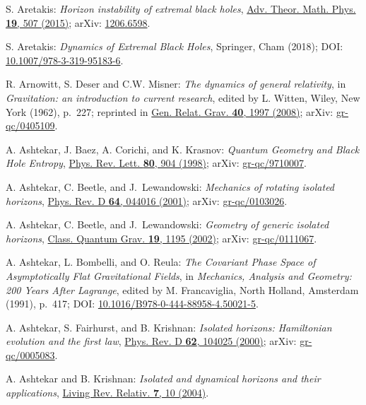 \begin{thebibliography}{123}
S. Aretakis:
{\em Horizon instability of extremal black holes},
\href{https://doi.org/10.4310/ATMP.2015.v19.n3.a1}{Adv. Theor. Math. Phys. {\bf 19}, 507 (2015)};
arXiv: \href{https://arxiv.org/abs/1206.6598}{1206.6598}.

S. Aretakis:
{\em Dynamics of Extremal Black Holes},
Springer, Cham (2018);
DOI: \href{https://doi.org/10.1007/978-3-319-95183-6}{10.1007/978-3-319-95183-6}.

R. Arnowitt, S. Deser and C.W. Misner:
{\em The dynamics of general relativity},
in {\em Gravitation: an introduction to current research},
edited by L. Witten,
Wiley, New York (1962), p.~227; reprinted in
\href{https://doi.org/10.1007/s10714-008-0661-1}{Gen. Relat. Grav. {\bf 40}, 1997 (2008)};
arXiv: \href{https://arxiv.org/abs/gr-qc/0405109}{gr-qc/0405109}.

A. Ashtekar, J. Baez, A. Corichi, and K. Krasnov:
{\em Quantum Geometry and Black Hole Entropy},
\href{https://doi.org/10.1103/PhysRevLett.80.904}{Phys. Rev. Lett. {\bf 80}, 904 (1998)};
arXiv: \href{https://arxiv.org/abs/gr-qc/9710007}{gr-qc/9710007}.

A. Ashtekar, C. Beetle, and J.~Lewandowski:
{\em Mechanics of rotating isolated horizons},
\href{https://doi.org/10.1103/PhysRevD.64.044016}{Phys. Rev. D {\bf 64}, 044016 (2001)};
arXiv: \href{https://arxiv.org/abs/gr-qc/0103026}{gr-qc/0103026}.

A. Ashtekar, C. Beetle, and J.~Lewandowski:
{\em Geometry of generic isolated horizons},
\href{https://doi.org/10.1088/0264-9381/19/6/311}{Class. Quantum Grav. {\bf 19}, 1195 (2002)};
arXiv: \href{https://arxiv.org/abs/gr-qc/0111067}{gr-qc/0111067}.

A. Ashtekar, L. Bombelli, and O. Reula:
{\em The Covariant Phase Space of Asymptotically Flat Gravitational Fields},
in {\em Mechanics, Analysis and Geometry: 200 Years After Lagrange},
edited by M. Francaviglia,
North Holland, Amsterdam (1991), p.~417;
DOI: \href{https://doi.org/10.1016/B978-0-444-88958-4.50021-5}{10.1016/B978-0-444-88958-4.50021-5}.

A. Ashtekar, S. Fairhurst, and B. Krishnan:
{\em Isolated horizons: Hamiltonian evolution and the first law},
\href{https://doi.org/10.1103/PhysRevD.62.104025}{Phys. Rev. D {\bf 62}, 104025 (2000)};
arXiv: \href{https://arxiv.org/abs/gr-qc/0005083}{gr-qc/0005083}.

A. Ashtekar and B. Krishnan: {\em Isolated and dynamical horizons
and their applications},
\href{https://doi.org/10.12942/lrr-2004-10}{Living Rev. Relativ. {\bf 7}, 10 (2004)}.


\end{thebibliography}
